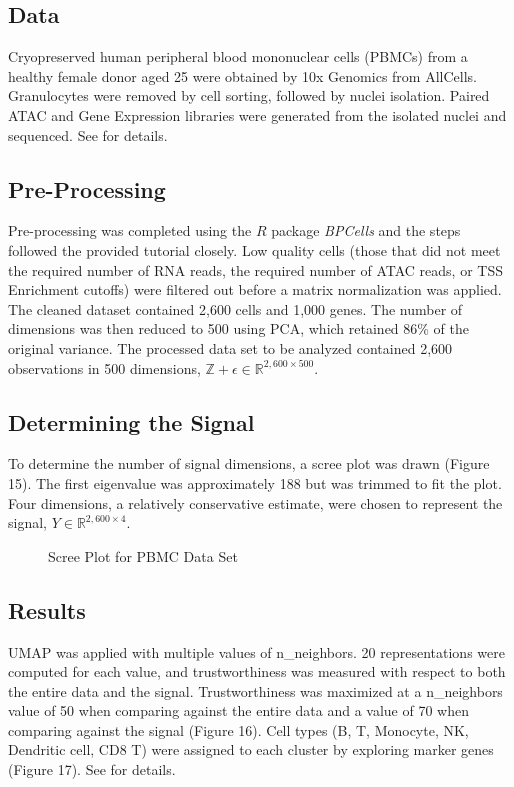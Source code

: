 \documentclass{article}
\begin{document}
\subsection{Data}
Cryopreserved human peripheral blood mononuclear cells (PBMCs) from a healthy female donor aged 25 were obtained by 10x Genomics from AllCells. Granulocytes were removed by cell sorting, followed by nuclei isolation. Paired ATAC and Gene Expression libraries were generated from the isolated nuclei and sequenced. See \cite{BPCells data} for details.

\subsection{Pre-Processing}
Pre-processing was completed using the $R$ package \textit{BPCells} and the steps followed the provided tutorial \cite{BPCells tutorial} closely. Low quality cells (those that did not meet the required number of RNA reads, the required number of ATAC reads, or TSS Enrichment cutoffs) were filtered out before a matrix normalization was applied. The cleaned dataset contained 2,600 cells and 1,000 genes. The number of dimensions was then reduced to 500 using PCA, which retained 86\% of the original variance. The processed data set to be analyzed contained 2,600 observations in 500 dimensions, $\mathbb{Z + \epsilon} \in \mathbb{R}^{2,600 \times 500}$.

\subsection{Determining the Signal}
To determine the number of signal dimensions, a scree plot was drawn (Figure 15). The first eigenvalue was approximately 188 but was trimmed to fit the plot. Four dimensions, a relatively conservative estimate, were chosen to represent the signal, $Y \in \mathbb{R}^{2,600 \times 4}$.

\renewcommand{\thefigure}{15}
\begin{figure}[H]
\centering
\caption{Scree Plot for PBMC Data Set}
\end{figure}

\subsection{Results}
UMAP was applied with multiple values of n\_neighbors. 20 representations were computed for each value, and trustworthiness was measured with respect to both the entire data and the signal. Trustworthiness was maximized at a n\_neighbors value of 50 when comparing against the entire data and a value of 70 when comparing against the signal (Figure 16). Cell types (B, T, Monocyte, NK, Dendritic cell, CD8 T) were assigned to each cluster by exploring marker genes (Figure 17). See \cite{BPCells tutorial} for details.
\end{document}
